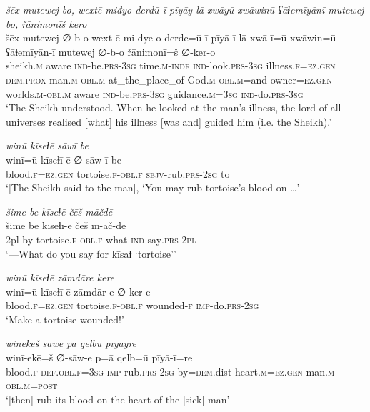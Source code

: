 \ea \label{DG.46}
\textit{šēx mutewej bo, wextē miđyo derdū ī pīyāy lā xwāyū xwāwinū ʕāɫemīyānī mutewej bo, řānimonīš kero} \\ 
\gll šēx mutewej ∅-b-o wext-ē mi-đye-o derde=ū ī pīyā-ī lā xwā-ī=ū xwāwin=ū ʕāɫemīyān-ī mutewej ∅-b-o řānimonī=š ∅-ker-o \\ 
 sheikh\textsc{.m} aware \textsc{ind-}be\textsc{.prs}\textsc{-3sg} time\textsc{.m}\textsc{-indf} \textsc{ind-}look\textsc{.prs}\textsc{-3sg} illness\textsc{\textsc{.f}}\textsc{=ez}\textsc{.gen} \textsc{dem.prox} man\textsc{.m}\textsc{-obl}\textsc{.m} at\_the\_place\_of God\textsc{.m}\textsc{-obl}\textsc{.m}=and owner\textsc{=ez}\textsc{.gen} worlds\textsc{.m}\textsc{-obl}\textsc{.m} aware \textsc{ind-}be\textsc{.prs}\textsc{-3sg} guidance\textsc{.m}\textsc{=3sg} \textsc{ind-}do\textsc{.prs}\textsc{-3sg} \\ 
\glt `The Sheikh understood. When he looked at the man’s illness, the lord of all universes realised [what] his illness [was and] guided him (i.e. the Sheikh).'
\z 
 
\ea \label{DG.47}
\textit{winū kīseɫē sāwī be} \\ 
\gll winī=ū kīseɫī-ē ∅-sāw-ī be \\ 
 blood\textsc{\textsc{.f}}\textsc{=ez}\textsc{.gen} tortoise\textsc{\textsc{.f}}\textsc{-obl}\textsc{\textsc{.f}} \textsc{sbjv-}rub\textsc{.prs}-\textsc{2sg} to \\ 
\glt `[The Sheikh said to the man], ‘You may rub tortoise’s blood on …'
\z 
 
\ea \label{DG.48}
\textit{šime be kīseɫē čēš māčdē} \\ 
\gll šime be kīseɫī-ē čēš m-āč-dē \\ 
 2pl by tortoise\textsc{\textsc{.f}}\textsc{-obl}\textsc{\textsc{.f}} what \textsc{ind-}say\textsc{.prs}\textsc{-2pl} \\ 
\glt `—What do you say for kīsaɫ ‘tortoise’'
\z 
 
\ea \label{DG.49}
\textit{winū kīseɫē zāmdāre kere} \\ 
\gll winī=ū kīseɫī-ē zāmdār-e ∅-ker-e \\ 
 blood\textsc{\textsc{.f}}\textsc{=ez}\textsc{.gen} tortoise\textsc{\textsc{.f}}\textsc{-obl}\textsc{\textsc{.f}} wounded\textsc{-f} \textsc{imp-}do\textsc{.prs}-\textsc{2sg} \\ 
\glt `Make a tortoise wounded!'
\z 
 
\ea \label{DG.50}
\textit{winekēš sāwe pā qelbū pīyāyre} \\ 
\gll winī-ekē=š ∅-sāw-e p=ā qelb=ū pīyā-ī=re \\ 
 blood\textsc{\textsc{.f}}\textsc{-def}\textsc{.obl}\textsc{\textsc{.f}}\textsc{=3sg} \textsc{imp-}rub\textsc{.prs}-\textsc{2sg} by\textsc{=dem}.dist heart\textsc{.m}\textsc{=ez}\textsc{.gen} man\textsc{.m}\textsc{-obl}\textsc{.m}\textsc{=\textsc{post}} \\ 
\glt `[then] rub its blood on the heart of the [sick] man'
\z 
 
